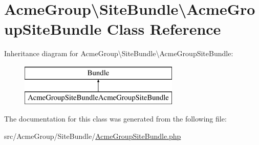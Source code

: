 \hypertarget{class_acme_group_1_1_site_bundle_1_1_acme_group_site_bundle}{\section{Acme\+Group\textbackslash{}Site\+Bundle\textbackslash{}Acme\+Group\+Site\+Bundle Class Reference}
\label{class_acme_group_1_1_site_bundle_1_1_acme_group_site_bundle}
}
Inheritance diagram for Acme\+Group\textbackslash{}Site\+Bundle\textbackslash{}Acme\+Group\+Site\+Bundle\+:\begin{figure}[H]
\begin{center}
\leavevmode
\includegraphics[height=2.000000cm]{class_acme_group_1_1_site_bundle_1_1_acme_group_site_bundle}
\end{center}
\end{figure}


The documentation for this class was generated from the following file\+:\begin{DoxyCompactItemize}
\item 
src/\+Acme\+Group/\+Site\+Bundle/\hyperlink{_acme_group_site_bundle_8php}{Acme\+Group\+Site\+Bundle.\+php}\end{DoxyCompactItemize}
